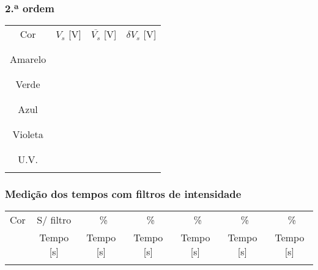 \documentclass[a4paper,12pt]{article}  %
\begin{document}
\subsubsection{2.ª ordem}
\begin{center}
	\begin{tabular}{|c|c|c|c|}
	\hline
	Cor  & $V_s$ [V] & $\overline{V_s}$ [V]	& $\delta V_s$ [V] \\
	  & & &  \\
	\hline
	 &  &  &    \\ \cline{2-2}
	Amarelo &  & &   \\ \cline{2-2}
	 &  &  &    \\ 
	\hline
	 &  &  &    \\ \cline{2-2}
	Verde & & & \\ \cline{2-2}
	 &  &  &    \\ 
	\hline
	 &  &  &    \\ \cline{2-2}
	Azul & & &  \\ \cline{2-2}
	 &  &  &    \\ 
	\hline
	 &  &  &    \\ \cline{2-2}
	Violeta & & &  \\ \cline{2-2}
	 &  &  &    \\ 
	\hline
	 &  &  &    \\ \cline{2-2}
	U.V. & & &  \\ \cline{2-2}
	 &  &  &    \\ 
	\hline
 	\end{tabular}
\end{center}

\subsubsection{Medição dos tempos com filtros de intensidade}
\begin{center}
	\begin{tabular}{|c|c|c|c|c|c|c|}
	\hline
	\quad Cor \quad  
	& S/ filtro
	& ~\underline{\makebox[0.7cm][r]{~}}\% 
	& ~\underline{\makebox[0.7cm][r]{~}}\% 
	& ~\underline{\makebox[0.7cm][r]{~}}\% 
	& ~\underline{\makebox[0.7cm][r]{~}}\% 
	& ~\underline{\makebox[0.7cm][r]{~}}\%  \\
	 & Tempo [s] &  Tempo [s] &  Tempo [s] &  Tempo [s] &  Tempo [s] &  Tempo [s]\\ 
	\hline
	 &  &  &  &  &  & \\ \cline{2-2}
	\hline
 	\end{tabular}
\end{center}
\end{document}
